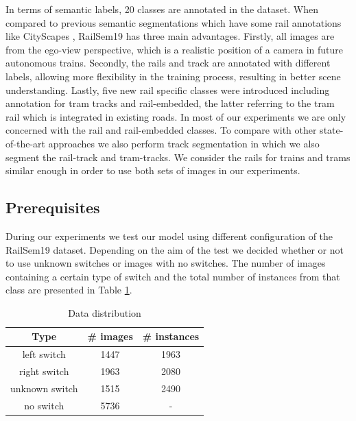 \documentclass[conference]{IEEEtran}
\begin{document}
In terms of semantic labels, 20 classes are annotated in the dataset. When compared to previous semantic segmentations which have some rail annotations like CityScapes \cite{cordts2016cityscapes}
, RailSem19 has three main advantages. Firstly, all images are from the ego-view perspective, which is a realistic position of a camera in future autonomous trains. Secondly, the rails and track are annotated with different labels, allowing more flexibility in the training process, resulting in better scene understanding. Lastly, five new rail specific classes were introduced including annotation for tram tracks and rail-embedded, the latter referring to the tram rail which is integrated in existing roads. In most of our experiments we are only concerned with the rail and rail-embedded classes. To compare with other state-of-the-art approaches we also perform track segmentation in which we also segment the rail-track and tram-tracks. We consider the rails for trains and trams similar enough in order to use both sets of images in our experiments. 

\subsection{Prerequisites}

During our experiments we test our model using different configuration of the RailSem19 dataset. Depending on the aim of the test we decided whether or not to use unknown switches or images with no switches. The number of images containing a certain type of switch and the total number of instances from that class are presented in Table \ref{tab:dataDistribution}. 

\begin{table}[h]
        \centering
        \caption{Data distribution}
        \begin{tabular}{c|c|c}
             Type           & \# images & \# instances \\ \hline
             left switch    & 1447         & 1963 \\ \hline
             right switch   & 1963         & 2080 \\ \hline
             unknown switch & 1515         & 2490 \\ \hline
             no switch      & 5736         & - \\ \hline
        \end{tabular}                        
        \label{tab:dataDistribution}
    \end{table}
\end{document}
